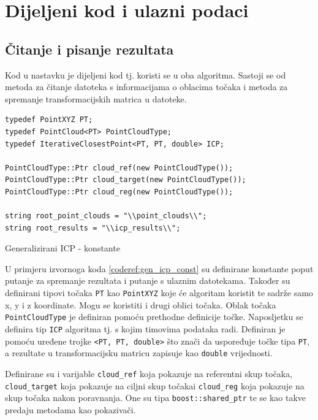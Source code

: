 \section{Dijeljeni kod i ulazni podaci}

\subsection{Čitanje i pisanje rezultata}

Kod u nastavku je dijeljeni kod tj. koristi se u oba algoritma. Sastoji se od metoda za čitanje datoteka s informacijama o oblacima točaka i metoda za spremanje transformacijskih matrica u datoteke. 

\begin{listing}[h!]
  \begin{verbatim}
typedef PointXYZ PT;
typedef PointCloud<PT> PointCloudType;
typedef IterativeClosestPoint<PT, PT, double> ICP;

PointCloudType::Ptr cloud_ref(new PointCloudType());
PointCloudType::Ptr cloud_target(new PointCloudType());
PointCloudType::Ptr cloud_reg(new PointCloudType());

string root_point_clouds = "\\point_clouds\\";
string root_results = "\\icp_results\\";
  \end{verbatim}
  \caption{Generalizirani ICP - konstante}
  \label{coderef:gen_icp_const}
\end{listing}

U primjeru izvornoga koda \ref{coderef:gen_icp_const} su definirane konstante poput putanje za spremanje rezultata i putanje s ulaznim datotekama. Također su definirani tipovi točaka \texttt{PT} kao \texttt{PointXYZ} koje će algoritam koristit te sadrže samo x, y i z koordinate. Mogu se koristiti i drugi oblici točaka. Oblak točaka \texttt{PointCloudType} je definiran pomoću prethodne definicije točke. Naposljetku se definira tip \texttt{ICP} algoritma tj. s kojim timovima podataka radi. Definiran je pomoću uređene trojke \texttt{<PT, PT, double>} što znači da uspoređuje točke tipa \texttt{PT}, a rezultate u transformacijsku matricu zapisuje kao \texttt{double} vrijednosti.

Definirane su i varijable \texttt{cloud_ref} koja pokazuje na referentni skup točaka, \texttt{cloud_target} koja pokazuje na ciljni skup točakai \texttt{cloud_reg} koja pokazuje na skup točaka nakon poravnanja. One su tipa \texttt{boost::shared_ptr} te se kao takve predaju metodama kao pokazivači.

